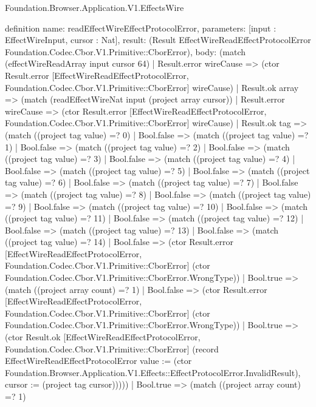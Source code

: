 \begin{lexlean}{Foundation.Browser.Application.V1.EffectsWire}
\begin{semanticmodule}
definition{
  name: readEffectWireEffectProtocolError,
  parameters: [input : EffectWireInput, cursor : Nat],
  result: (Result EffectWireReadEffectProtocolError Foundation.Codec.Cbor.V1.Primitive::CborError),
  body: (match (effectWireReadArray input cursor 64)
    | Result.error wireCause => (ctor Result.error [EffectWireReadEffectProtocolError, Foundation.Codec.Cbor.V1.Primitive::CborError] wireCause)
    | Result.ok array => (match (readEffectWireNat input (project array cursor))
      | Result.error wireCause => (ctor Result.error [EffectWireReadEffectProtocolError, Foundation.Codec.Cbor.V1.Primitive::CborError] wireCause)
      | Result.ok tag => (match ((project tag value) =? 0)
        | Bool.false => (match ((project tag value) =? 1)
          | Bool.false => (match ((project tag value) =? 2)
            | Bool.false => (match ((project tag value) =? 3)
              | Bool.false => (match ((project tag value) =? 4)
                | Bool.false => (match ((project tag value) =? 5)
                  | Bool.false => (match ((project tag value) =? 6)
                    | Bool.false => (match ((project tag value) =? 7)
                      | Bool.false => (match ((project tag value) =? 8)
                        | Bool.false => (match ((project tag value) =? 9)
                          | Bool.false => (match ((project tag value) =? 10)
                            | Bool.false => (match ((project tag value) =? 11)
                              | Bool.false => (match ((project tag value) =? 12)
                                | Bool.false => (match ((project tag value) =? 13)
                                  | Bool.false => (match ((project tag value) =? 14)
                                    | Bool.false => (ctor Result.error [EffectWireReadEffectProtocolError, Foundation.Codec.Cbor.V1.Primitive::CborError] (ctor Foundation.Codec.Cbor.V1.Primitive::CborError.WrongType))
                                    | Bool.true => (match ((project array count) =? 1)
                                      | Bool.false => (ctor Result.error [EffectWireReadEffectProtocolError, Foundation.Codec.Cbor.V1.Primitive::CborError] (ctor Foundation.Codec.Cbor.V1.Primitive::CborError.WrongType))
                                      | Bool.true => (ctor Result.ok [EffectWireReadEffectProtocolError, Foundation.Codec.Cbor.V1.Primitive::CborError] (record EffectWireReadEffectProtocolError {value := (ctor Foundation.Browser.Application.V1.Effects::EffectProtocolError.InvalidResult), cursor := (project tag cursor)}))))
                                  | Bool.true => (match ((project array count) =? 1)
}
\end{semanticmodule}
\end{lexlean}
